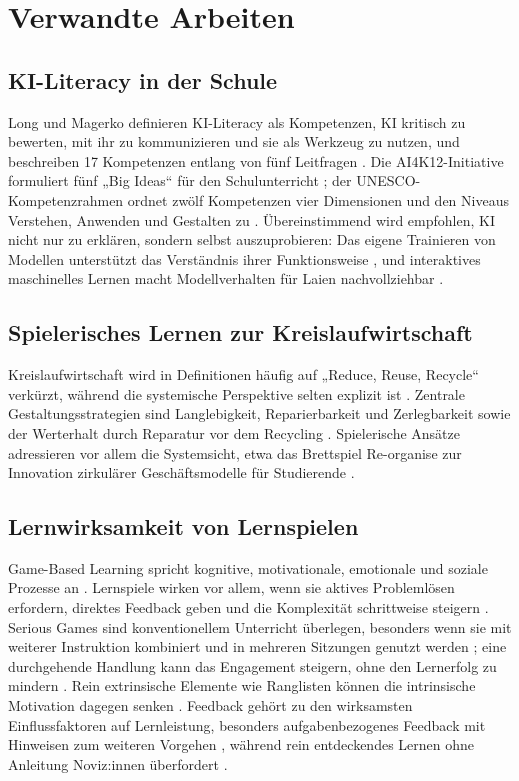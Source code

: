 \documentclass[sigconf,nonacm]{acmart}
\begin{document}
\section{Verwandte Arbeiten}
\label{sec:related}
\subsection{KI-Literacy in der Schule}
Long und Magerko definieren KI-Literacy als Kompetenzen, KI kritisch zu bewerten, mit ihr zu kommunizieren und sie als Werkzeug zu nutzen, und beschreiben 17 Kompetenzen entlang von fünf Leitfragen \cite{long2020}. Die AI4K12-Initiative formuliert fünf „Big Ideas“ für den Schulunterricht \cite{touretzky2019}; der UNESCO-Kompetenzrahmen ordnet zwölf Kompetenzen vier Dimensionen und den Niveaus Verstehen, Anwenden und Gestalten zu \cite{unesco2024}. Übereinstimmend wird empfohlen, KI nicht nur zu erklären, sondern selbst auszuprobieren: Das eigene Trainieren von Modellen unterstützt das Verständnis ihrer Funktionsweise \cite{druga2019}, und interaktives maschinelles Lernen macht Modellverhalten für Laien nachvollziehbar \cite{amershi2014}.

\subsection{Spielerisches Lernen zur Kreislaufwirtschaft}
Kreislaufwirtschaft wird in Definitionen häufig auf „Reduce, Reuse, Recycle“ verkürzt, während die systemische Perspektive selten explizit ist \cite{kirchherr2017}. Zentrale Gestaltungsstrategien sind Langlebigkeit, Reparierbarkeit und Zerlegbarkeit \cite{bocken2016} sowie der Werterhalt durch Reparatur vor dem Recycling \cite{stahel2013}. Spielerische Ansätze adressieren vor allem die Systemsicht, etwa das Brettspiel Re-organise zur Innovation zirkulärer Geschäftsmodelle für Studierende \cite{lange2022}.

\subsection{Lernwirksamkeit von Lernspielen}
Game-Based Learning spricht kognitive, motivationale, emotionale und soziale Prozesse an \cite{plass2015}. Lernspiele wirken vor allem, wenn sie aktives Problemlösen erfordern, direktes Feedback geben und die Komplexität schrittweise steigern \cite{mayer2019}. Serious Games sind konventionellem Unterricht überlegen, besonders wenn sie mit weiterer Instruktion kombiniert und in mehreren Sitzungen genutzt werden \cite{wouters2013}; eine durchgehende Handlung kann das Engagement steigern, ohne den Lernerfolg zu mindern \cite{rowe2011}. Rein extrinsische Elemente wie Ranglisten können die intrinsische Motivation dagegen senken \cite{hanus2015}. Feedback gehört zu den wirksamsten Einflussfaktoren auf Lernleistung, besonders aufgabenbezogenes Feedback mit Hinweisen zum weiteren Vorgehen \cite{hattie2007,shute2008}, während rein entdeckendes Lernen ohne Anleitung Noviz:innen überfordert \cite{kirschner2006}.
\end{document}
